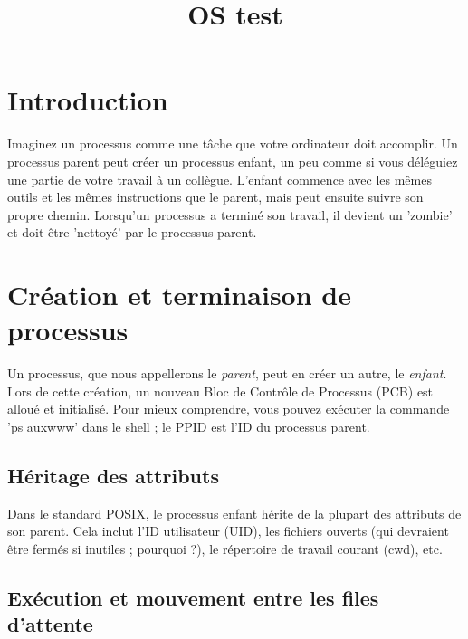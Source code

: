 \documentclass[12pt]{report}
\title{OS test}
\author{}
\begin{document}
\maketitle
\tableofcontents
\newpage

\section{Introduction}
\begin{tcolorbox}[
     colback=blue!10,
     colframe=blue,
     title={\fontfamily{lmr}\selectfont \faComment\ Vulgarisation simple},
     fonttitle=\bfseries,
     fontupper=\fontfamily{lmr}\selectfont,
     boxrule=1pt,
     sharp corners,
     ]
     Imaginez un processus comme une tâche que votre ordinateur doit accomplir. Un processus parent peut créer un processus enfant, un peu comme si vous déléguiez une partie de votre travail à un collègue. L'enfant commence avec les mêmes outils et les mêmes instructions que le parent, mais peut ensuite suivre son propre chemin. Lorsqu'un processus a terminé son travail, il devient un 'zombie' et doit être 'nettoyé' par le processus parent.
\end{tcolorbox}
\section{Création et terminaison de processus}

Un processus, que nous appellerons le \textit{parent}, peut en créer un autre, le \textit{enfant}. Lors de cette création, un nouveau Bloc de Contrôle de Processus (PCB) est alloué et initialisé. Pour mieux comprendre, vous pouvez exécuter la commande 'ps auxwww' dans le shell ; le PPID est l'ID du processus parent.

\subsection{Héritage des attributs}

Dans le standard POSIX, le processus enfant hérite de la plupart des attributs de son parent. Cela inclut l'ID utilisateur (UID), les fichiers ouverts (qui devraient être fermés si inutiles ; pourquoi ?), le répertoire de travail courant (cwd), etc.

\subsection{Exécution et mouvement entre les files d'attente}
\end{document}
